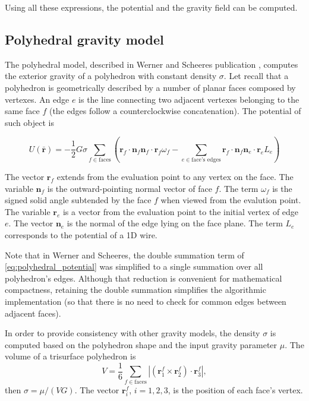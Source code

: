 Using all these expressions, the potential and the gravity field can be computed.

\subsection{Polyhedral gravity model}

The polyhedral model, described in Werner and Scheeres publication\cite{werner1996} , computes the exterior gravity of a polyhedron with constant density $\sigma$. Let recall that a polyhedron is geometrically described by a number of planar faces composed by vertexes. An edge $e$ is the line connecting two adjacent vertexes belonging to the same face $f$ (the edges follow a counterclockwise concatenation). The potential of such object is

\begin{equation}
U(\bar{\mathbf{r}})=- \frac{1}{2}G\sigma\sum_{f\in\text{faces}}\left(\mathbf{r}_f \cdot\mathbf{n}_f\mathbf{n}_f\cdot\mathbf{r}_f\omega_f-\sum_{e\in\text{face's edges}}\mathbf{r}_f\cdot\mathbf{n}_f\mathbf{n}_e\cdot\mathbf{r}_e L_e\right)\label{eq:polyhedral_potential}
\end{equation}

 The vector $\mathbf{r}_f$ extends from the evaluation point to any vertex on the face. The variable $\mathbf{n}_f$ is the outward-pointing normal vector of face $f$. The term $\omega_f$ is the signed solid angle subtended by the face $f$ when viewed from the evalution point. The variable $\mathbf{r}_e$ is a vector from the evaluation point to the initial vertex of edge $e$. The vector $\mathbf{n}_e$ is the normal of the edge lying on the face plane. The term $L_e$ corresponds to the potential of a 1D wire.
 
 Note that in Werner and Scheeres\cite{werner1996}, the double summation term of \eqref{eq:polyhedral_potential} was simplified to a single summation over all polyhedron's edges. Although that reduction is convenient for mathematical compactness, retaining the double summation simplifies the algorithmic implementation (so that there is no need to check for common edges between adjacent faces).
 
 In order to provide consistency with other gravity models, the density $\sigma$ is computed based on the polyhedron shape and the input gravity parameter $\mu$. The volume of a trisurface polyhedron is
 \begin{equation}
 V = \frac{1}{6}\sum_{f\in\text{faces}}|(\mathbf{r}^{f}_1\times\mathbf{r}^{f}_2)\cdot \mathbf{r}^{f}_3|,
 \end{equation}
then $\sigma=\mu / (VG)$. The vector $\mathbf{r}^{f}_i$, $i=1,2,3$, is the position of each face's vertex.

